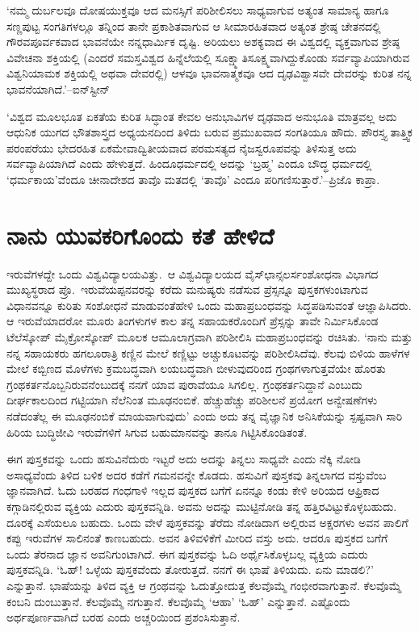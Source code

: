 ‘ನಮ್ಮ ದುರ್ಬಲವೂ ದೋಷಯುಕ್ತವೂ ಆದ ಮನಸ್ಸಿಗೆ ಪರಿಶೀಲಿಸಲು ಸಾಧ್ಯವಾಗುವ ಅತ್ಯಂತ ಸಾಮಾನ್ಯ ಹಾಗೂ ಸಣ್ಣಪುಟ್ಟ ಸಂಗತಿಗಳಲ್ಲೂ ತನ್ನಿಂದ ತಾನೇ ಪ್ರಕಾಶಿತವಾಗುವ ಆ ಸೀಮಾರಹಿತವಾದ ಅತ್ಯಂತ ಶ್ರೇಷ್ಠ ಚೇತನದಲ್ಲಿ ಗೌರವಪೂರ್ವಕವಾದ ಭಾವನೆಯೇ ನನ್ನ\break ಧಾರ್ಮಿಕ ದೃಷ್ಟಿ. ಅರಿಯಲು ಅಶಕ್ಯವಾದ ಈ ವಿಶ್ವದಲ್ಲಿ ವ್ಯಕ್ತವಾಗುವ ಶ್ರೇಷ್ಠ ವಿವೇಚನಾ ಶಕ್ತಿಯಲ್ಲಿ (ಎಂದರೆ ಸಮಸ್ತವಿಶ್ವದ ಹಿನ್ನೆಲೆಯಲ್ಲಿ ಸೂಕ್ಷ್ಮಾತಿಸೂಕ್ಷ್ಮವಾಗಿದ್ದುಕೊಂಡು ಸರ್ವವ್ಯಾಪಿ\-ಯಾಗಿರುವ ವಿಶ್ವನಿಯಾಮಕ ಶಕ್ತಿಯಲ್ಲಿ ಅಥವಾ ದೇವರಲ್ಲಿ) ಆಳವೂ ಭಾವನಾತ್ಮಕವೂ ಆದ ದೃಢವಿಶ್ವಾಸವೇ ದೇವರನ್ನು ಕುರಿತ ನನ್ನ ಭಾವನೆಯಾಗಿದೆ.’–ಐನ್​ಸ್ಟೀನ್

‘ವಿಶ್ವದ ಮೂಲಭೂತ ಏಕತೆಯ ಕುರಿತ ಸಿದ್ಧಾಂತ ಕೇವಲ ಅನುಭಾವಿಗಳ ದೃಢವಾದ ಅನುಭೂತಿ ಮಾತ್ರವಲ್ಲ ಅದು ಆಧುನಿಕ ಯುಗದ ಭೌತಶಾಸ್ತ್ರದ ಅಧ್ಯಯನದಿಂದ ತಿಳಿದು ಬರುವ ಪ್ರಮುಖವಾದ ಸಂಗತಿಯೂ ಹೌದು. ಪೌರಸ್ತ್ಯ ತಾತ್ತ್ವಿಕ ಪರಂಪರೆಯು ಭೇದರಹಿತ ಏಕಮೇವಾದ್ವಿತೀಯವಾದ ಪರಮಸತ್ಯದ ನೈಜಸ್ವರೂಪವನ್ನು ತಿಳಿಸುತ್ತ ಅದು ಸರ್ವವ್ಯಾಪಿ\-\break ಯಾಗಿದೆ ಎಂದು ಹೇಳುತ್ತದೆ. ಹಿಂದೂಧರ್ಮದಲ್ಲಿ ಅದನ್ನು ‘ಬ್ರಹ್ಮ’ ಎಂದೂ ಬೌದ್ಧ ಧರ್ಮದಲ್ಲಿ ‘ಧರ್ಮಕಾಯ’ವೆಂದೂ ಚೀನಾದೇಶದ ತಾವೊ ಮತದಲ್ಲಿ ‘ತಾವೊ’ ಎಂದೂ ಪರಿಗಣಿಸುತ್ತಾರೆ.’–ಪ್ರಿಜೊ ಕಾಪ್ರಾ.

\section*{ನಾನು ಯುವಕರಿಗೊಂದು ಕತೆ ಹೇಳಿದೆ}


ಇರುವೆಗಳದ್ದೇ ಒಂದು ವಿಶ್ವವಿದ್ಯಾಲಯವಿತ್ತು.\ ಆ ವಿಶ್ವವಿದ್ಯಾಲಯದ ವೈಸ್​ಛಾನ್ಸಲರ್\break ಸಂಶೋಧನಾ ವಿಭಾಗದ ಮುಖ್ಯಸ್ಥರಾದ ಪ್ರೊ.\ ಇರುವೆಯಪ್ಪನವರನ್ನು ಕರೆದು ಮನುಷ್ಯರು ನಡೆಸುವ ಪ್ರೆಸ್ಸನ್ನೂ ಪುಸ್ತಕಗಳುಂಟಾಗುವ ವಿಧಾನವನ್ನೂ ಕುರಿತು ಸಂಶೋಧನೆ ಮಾಡುವಂತೆ\break ಹೇಳಿ ಒಂದು ಮಹಾಪ್ರಬಂಧವನ್ನು ಸಿದ್ಧಪಡಿಸುವಂತೆ ಆಜ್ಞಾಪಿಸಿದರು. ಆ ಇರುವೆಯಾದರೋ ಮೂರು ತಿಂಗಳುಗಳ ಕಾಲ ತನ್ನ ಸಹಾಯಕರೊಂದಿಗೆ ಪ್ರೆಸ್ಸನ್ನು ತಾವೇ ನಿರ್ಮಿಸಿಕೊಂಡ ಟೆಲೆ\-ಸ್ಕೋಪ್ ಮೈಕ್ರೋಸ್ಕೋಪ್ ಮೂಲಕ ಆಮೂಲಾಗ್ರವಾಗಿ ಪರಿಶೀಲಿಸಿ ಮಹಾಪ್ರಬಂಧವನ್ನು ರಚಿಸಿತು. ‘ನಾನು ಮತ್ತು ನನ್ನ ಸಹಾಯಕರು ಹಗಲೂರಾತ್ರಿ ಕಣ್ಣಿನ ಮೇಲೆ ಕಣ್ಣಿಟ್ಟು ಅಚ್ಚುಕೂಟವನ್ನು ಪರಿಶೀಲಿಸಿದೆವು. ಕೆಲವು ಬಿಳಿಯ ಹಾಳೆಗಳ ಮೇಲೆ ಕಬ್ಬಿಣದ ಮೊಳೆಗಳು ಕ್ರಮಬದ್ಧವಾಗಿ ಲಯಬದ್ಧವಾಗಿ ಬೀಳುವುದರಿಂದ ಗ್ರಂಥಗಳಾಗುತ್ತವೆಯೇ ಹೊರತು ಗ್ರಂಥಕರ್ತನೊಬ್ಬ\-ನಿರುವ\-ನೆಂಬುದಕ್ಕೆ ನನಗೆ ಯಾವ ಪುರಾವೆಯೂ ಸಿಗಲಿಲ್ಲ. ಗ್ರಂಥಕರ್ತನಿದ್ದಾನೆ ಎಂಬುದು ದೀರ್ಘಕಾಲದಿಂದ ಗಟ್ಟಿಯಾಗಿ ನೆಲೆನಿಂತ ಮೂಢನಂಬಿಕೆ. ಹೆಚ್ಚುಹೆಚ್ಚು ಪರಿಶೀಲನೆ ಪ್ರಯೋಗ ಅನ್ವೇಷಣೆಗಳು ನಡೆದಂತೆಲ್ಲ ಈ ಮೂಢನಂಬಿಕೆ ಮಾಯವಾಗುವುದು’ ಎಂದು ಅದು ತನ್ನ ವೈಜ್ಞಾನಿಕ ಅನಿಸಿಕೆಯನ್ನು ಸ್ಪಷ್ಟವಾಗಿ ಸಾರಿ ಹಿರಿಯ ಬುದ್ಧಿಜೀವಿ ಇರುವೆಗಳಿಗೆ ಸಿಗುವ ಬಹುಮಾನವನ್ನು ತಾನೂ ಗಿಟ್ಟಿಸಿಕೊಂಡಿತಂತೆ.

ಈಗ ಪುಸ್ತಕವನ್ನು ಒಂದು ಹಸುವಿನೆದುರು ಇಟ್ಟರೆ ಅದು ಅದನ್ನು ತಿನ್ನಲು ಸಾಧ್ಯವೇ ಎಂದು ನೆಕ್ಕಿ ನೋಡಿ ಅಸಾಧ್ಯವೆಂದು ತಿಳಿದ ಬಳಿಕ ಅದರ ಕಡೆಗೆ ಗಮನವನ್ನೇ ಕೊಡದು. ಹಸುವಿಗೆ ಪುಸ್ತಕವು ತಿನ್ನಲಾಗದ ವಸ್ತುವೆಂಬ ಜ್ಞಾನವಾಗಿದೆ. ಓದು ಬರಹದ ಗಂಧಗಾಳಿ ಇಲ್ಲದ ಪುಸ್ತಕದ ಬಗೆಗೆ ಏನನ್ನೂ ಕಂಡು ಕೇಳಿ ಅರಿಯದ ಆಫ್ರಿಕಾದ ಕಗ್ಗಾಡಿನಲ್ಲಿರುವ ವ್ಯಕ್ತಿಯ ಎದುರು ಪುಸ್ತಕವನ್ನಿಡಿ. ಅವನು ಅದನ್ನು ಮುಟ್ಟಿನೋಡಿ ತನ್ನ ಹತ್ತಿರವಿಟ್ಟುಕೊಳ್ಳಬಹುದು. ದೂರಕ್ಕೆ ಎಸೆಯಲೂ ಬಹುದು. ಒಂದು ವೇಳೆ ಪುಸ್ತಕವನ್ನು ತೆರೆದು ನೋಡಿದಾಗ ಅಲ್ಲಿರುವ ಅಕ್ಷರಗಳು ಅವನ ಪಾಲಿಗೆ ಕಪ್ಪು ಇರುವೆಗಳ ಸಾಲಿನಂತೆ ಕಾಣಬಹುದು. ಅವನ ತಿಳಿವಳಿಕೆಗೆ ಮೀರಿದ ವಸ್ತು ಅದು. ಆದರೂ ಪುಸ್ತಕದ ಬಗೆಗೆ ಒಂದು ತೆರನಾದ ಜ್ಞಾನ ಅವನಿಗುಂಟಾಗಿದೆ. ಈಗ ಪುಸ್ತಕವನ್ನು ಓದಿ ಅರ್ಥೈಸಿಕೊಳ್ಳಬಲ್ಲ ವ್ಯಕ್ತಿಯ ಎದುರು ಪುಸ್ತಕವನ್ನಿಡಿ. ‘ಓಹ್​! ಒಳ್ಳೆಯ ಪುಸ್ತಕವೆಂದು ತೋರುತ್ತದೆ. ನನಗೆ ಈ ಭಾಷೆ ತಿಳಿಯದು. ಏನು ಮಾಡಲಿ?’ ಎನ್ನುತ್ತಾನೆ. ಭಾಷೆಯನ್ನು ತಿಳಿದ ವ್ಯಕ್ತಿ ಆ ಗ್ರಂಥವನ್ನು ಓದುತ್ತೋದುತ್ತ ಕೆಲವೊಮ್ಮೆ ಗಂಭೀರವಾಗುತ್ತಾನೆ. ಕೆಲವೊಮ್ಮೆ ಕಂಬನಿ ದುಂಬುತ್ತಾನೆ. ಕೆಲವೊಮ್ಮೆ ನಗುತ್ತಾನೆ. ಕೆಲವೊಮ್ಮೆ ‘ಆಹಾ’ ‘ಓಹ್​’ ಎನ್ನುತ್ತಾನೆ. ಎಷ್ಟೊಂದು ಅರ್ಥಪೂರ್ಣವಾಗಿದೆ ಬರಹ ಎಂದು ಅಚ್ಚರಿಯಿಂದ ಪ್ರಶಂಸಿಸುತ್ತಾನೆ.

